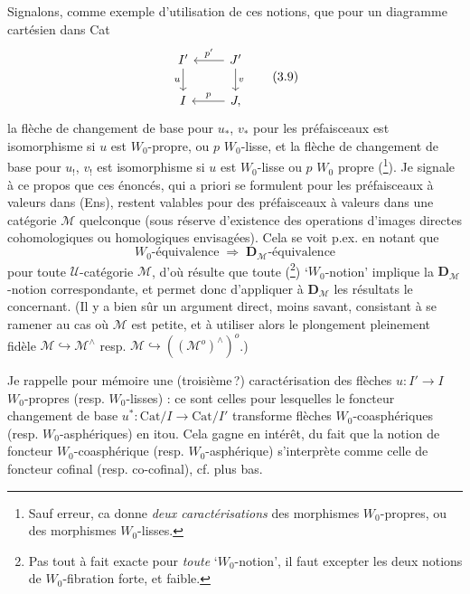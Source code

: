 \documentclass[11pt]{article}
\newcommand{\msp}[1]{\marginpar{\footnotesize [#1]}}
\newcommand{\Cat}{\mathrm{Cat}}
\begin{document}
Signalons, comme exemple d'utilisation de ces notions, que pour un diagramme cartésien dans Cat
\[
\begin{tikzcd}
I' \arrow[d, "u"'] & J' \arrow[l, "p'"'] \arrow[d, "v"] \\
I & J, \arrow[l, "p"']
\end{tikzcd} \tag*{(3.9)}
\]
la flèche de changement de base pour $u_*$, $v_*$ pour les préfaisceaux est isomorphisme si $u$ est $W_0$-propre, ou $p$ $W_0$-lisse, et la flèche de changement de base pour $u_!$, $v_!$ est isomorphisme si $u$ est $W_0$-lisse ou $p$ $W_0$ propre (\footnote[51]{Sauf erreur, ca donne \textit{deux caractérisations} des morphismes $W_0$-propres, ou des morphismes $W_0$-lisses.}). Je signale à ce propos que ces énoncés, qui a priori se formulent pour les préfaisceaux à valeurs dans (Ens), restent valables %
\msp{page 40}
pour des préfaisceaux à valeurs dans une catégorie $\mathcal{M}$ quelconque (sous réserve d'existence des operations d'images directes cohomologiques ou homologiques envisagées). Cela se voit p.ex. en notant que %
\[
\text{$W_0$-équivalence} \;\Longrightarrow\; \text{$\mathbf{D}_{\mathcal{M}}$-équivalence} \tag*{(3.10)}
\]
pour toute $\mathcal{U}$-catégorie $\mathcal{M}$, d'où résulte que toute (\footnote[52]{Pas tout à fait exacte pour \textit{toute} ‘$W_0$-notion’, il faut excepter les deux notions de $W_0$-fibration forte, et faible.}) ‘$W_0$-notion’ implique la $\mathbf{D}_{\mathcal{M}}$-notion correspondante, et permet donc d'appliquer à $\mathbf{D}_{\mathcal{M}}$ les résultats le concernant. (Il y a bien sûr un argument direct, moins savant, consistant à se ramener au cas où $\mathcal{M}$ est petite, et à utiliser alors le plongement pleinement fidèle $\mathcal{M} \hookrightarrow \mathcal{M}^{\wedge}$ resp. $\mathcal{M} \hookrightarrow ((\mathcal{M}^o)^{\wedge})^o$.)

Je rappelle pour mémoire une (troisième\,?) caractérisation des flèches $u : I' \longrightarrow I$ $W_0$-propres (resp. $W_0$-lisses) : ce sont celles pour lesquelles le foncteur changement de base $u^* : \Cat/I \longrightarrow \Cat/I'$ transforme flèches $W_0$-coasphériques (resp. $W_0$-asphériques) en itou. Cela gagne en intérêt, du fait que la notion de foncteur $W_0$-coasphérique (resp. $W_0$-asphérique) s'interprète comme celle de foncteur cofinal (resp. co-cofinal), cf. plus bas.
\end{document}
